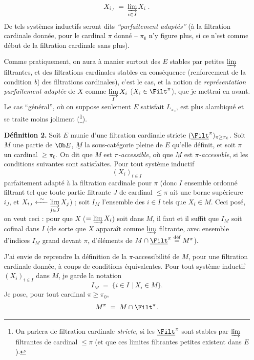 \[
X_{i_J} \;=\; \varinjlim_{i\in J} X_i \;.
\]
De tels systèmes inductifs seront dits \textit{“parfaitement adaptés”} (à la filtration cardinale donnée, pour le cardinal $\pi$ donné – $\pi_0$ n'y figure plus, si ce n'est comme début de la filtration cardinale sans plus).

Comme pratiquement, on aura à manier surtout des $E$ stables par petites $\varinjlim$ filtrantes, et des filtrations cardinales stables en conséquence (renforcement de la condition \textit{b}) des filtrations cardinales), c'est le cas, et la notion de \textit{représentation parfaitement adaptée} de $X$ comme $\varinjlim\limits_{I} X_i$ ($X_i\in\Filt^\pi$), que je mettrai en avant. Le cas “général”, où on suppose seulement $E$ satisfait $L_{\pi_0}$, est plus alambiqué et se traite moins joliment (\footnote[41]{On parlera de filtration cardinale \textit{stricte,} si les $\underline{\Filt}^\pi$ sont stables par $\varinjlim$ filtrantes de cardinal $\le\pi$ (et que ces limites filtrantes petites existent dans $E$).}).

\textbf{Définition 2.} Soit $E$ munie d'une filtration cardinale stricte $(\underline{\Filt}^\pi)_{\pi\ge\pi_0}$. Soit $M$ une partie de $\Ob E$, $\underline{M}$ la sous-catégorie pleine de $E$ qu'elle définit, et soit $\pi$ un cardinal $\ge\pi_0$. On dit que $M$ est \textit{$\pi$-accessible,} où que $\underline{M}$ est \textit{$\pi$-accessible}, %
si les conditions suivantes sont satisfaites. Pour tout système inductif
\[
(X_i)_{i\in I}
\]
parfaitement adapté à la filtration cardinale pour $\pi$ (donc $I$ ensemble ordonné filtrant tel que toute partie filtrante $J$ de cardinal $\le\pi$ ait une borne supérieure $i_J$, et $X_{i_J}\xleftarrow{\ \sim\ }\varinjlim\limits_{j\in J} X_j$) ; soit $I_M$ l'ensemble des $i\in I$ tels que $X_i\in M$. Ceci posé, on veut ceci : pour que $X$ ($=\varinjlim X_i$) soit dans $M$, il faut et il suffit que $I_M$ soit cofinal dans $I$ (de sorte que $X$ apparaît comme $\varinjlim$ filtrante, avec ensemble d'indices $I_M$ grand devant $\pi$, d'éléments de $M\cap\underline{\Filt}^\pi\overset{\text{déf}}{=}M^\pi$).

J'ai envie de reprendre la définition de la $\pi$-accessibilité de $M$, pour une filtration cardinale donnée, à coups de conditions équivalentes. Pour tout système inductif $(X_i)_{i\in I}$ dans $M$, je garde la notation
\[
I_M \;=\; \{i\in I \mid X_i\in M\}.
\]
Je pose, pour tout cardinal $\pi\ge\pi_0$,
\[
M^\pi \;=\; M\cap\Filt^\pi .
\]

